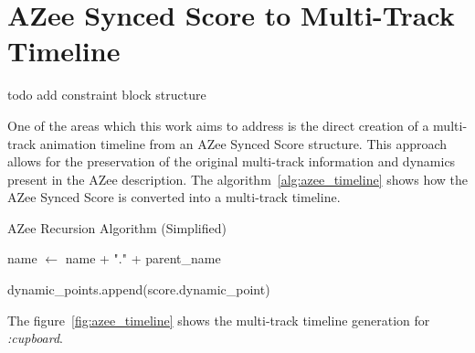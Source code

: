\documentclass[../../main.tex]{subfiles}
\begin{document}
\section{AZee Synced Score to Multi-Track Timeline}
\label{ch:multi_track:score_to_timeline}

todo add constraint block structure

One of the areas which this work aims to address is the direct creation of a multi-track animation timeline from an AZee Synced Score structure. This approach allows for the preservation of the original multi-track information and dynamics present in the AZee description. The algorithm~\ref{alg:azee_timeline} shows how the AZee Synced Score is converted into a multi-track timeline.

\begin{algorithm}
    \caption{AZee Recursion Algorithm (Simplified)}
    \label{alg:azee_timeline}
    \begin{algorithmic}[1]
                \State name $\gets$ name + "." + parent\_name
                \State {}
            \EndIf
            
            \State {}
                \State dynamic\_points.append(score.dynamic\_point)
            \EndIf
            
                \State \Return {}
                    \State {}
                \EndFor
            \Else
                \State \Return {}
            \EndIf
            
                \State {}
            \EndIf
        \EndFunction
    \end{algorithmic}
\end{algorithm}

The figure~\ref{fig:azee_timeline} shows the multi-track timeline generation for \emph{:cupboard}.
\end{document}
